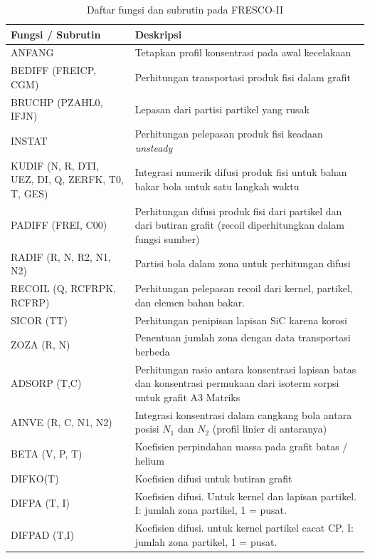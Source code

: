 \documentclass[a4paper,11pt]{report}
\begin{document}
\begin{table}[h!]
  \caption{Daftar fungsi dan subrutin pada FRESCO-II}
  \label{tab:daftarsubrutin}
  \begin{center}
    \begin{tabular}{p{3cm}p{10cm}} \toprule
    Fungsi / Subrutin & Deskripsi\\ \midrule
    ANFANG & Tetapkan profil konsentrasi pada awal kecelakaan \\ \hline
    BEDIFF (FREICP, CGM) & Perhitungan transportasi produk fisi dalam grafit\\ \hline
    BRUCHP (PZAHL0, IFJN) & Lepasan dari partisi partikel yang rusak\\ \hline
    INSTAT & Perhitungan pelepasan produk fisi keadaan \textit{unsteady}\\ \hline
    KUDIF (N, R, DTI, UEZ, DI, Q, ZERFK, T0, T, GES) & Integrasi numerik difusi produk fisi untuk bahan bakar bola untuk satu langkah waktu\\ \hline
    PADIFF (FREI, C00) & Perhitungan difusi produk fisi dari partikel dan dari butiran grafit (recoil diperhitungkan dalam fungsi sumber)\\ \hline
    RADIF (R, N, R2, N1, N2) & Partisi bola dalam zona untuk perhitungan difusi\\ \hline
    RECOIL (Q, RCFRPK, RCFRP) & Perhitungan pelepasan recoil dari kernel, partikel, dan elemen bahan bakar.\\ \hline
    SICOR (TT) & Perhitungan penipisan lapisan SiC karena korosi\\ \hline
    ZOZA (R, N) & Penentuan jumlah zona dengan data transportasi berbeda\\ \hline
    ADSORP (T,C) & Perhitungan rasio antara konsentrasi lapisan batas dan konsentrasi permukaan dari isoterm sorpsi untuk grafit A3 Matriks\\ \hline
    AINVE (R, C, N1, N2) & Integrasi konsentrasi dalam cangkang bola antara posisi $N_1$ dan $N_2$ (profil linier di antaranya)\\ \hline
    BETA (V, P, T) & Koefisien perpindahan massa pada grafit batas / helium\\ \hline
    DIFKO(T) & Koefisien difusi untuk butiran grafit\\ \hline
    DIFPA (T, I) & Koefisien difusi. Untuk kernel dan lapisan partikel. I: jumlah zona partikel, 1 = pusat.\\ \hline
    DIFPAD (T,I) & Koefisien difusi. untuk kernel partikel cacat CP. I: jumlah zona partikel, 1 = pusat.\\ \hline

\end{tabular}
\end{center}
\end{table}
\end{document}
